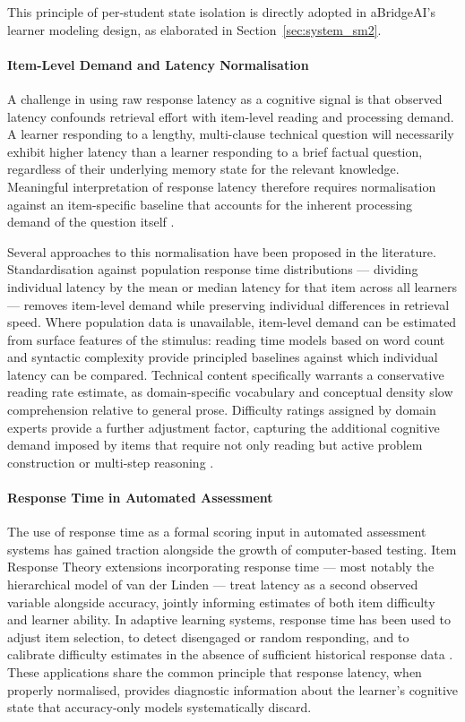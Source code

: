 This principle of per-student state isolation is directly adopted in aBridgeAI's learner modeling design, as elaborated in Section~\ref{sec:system_sm2}.

\paragraph{Item-Level Demand and Latency Normalisation}
A challenge in using raw response latency as a cognitive signal is that observed latency confounds retrieval effort with item-level reading and processing demand. A learner responding to a lengthy, multi-clause technical question will necessarily exhibit higher latency than a learner responding to a brief factual question, regardless of their underlying memory state for the relevant knowledge. Meaningful interpretation of response latency therefore requires normalisation against an item-specific baseline that accounts for the inherent processing demand of the question itself \cite{cowan2001}.

Several approaches to this normalisation have been proposed in the literature. Standardisation against population response time distributions — dividing individual latency by the mean or median latency for that item across all learners — removes item-level demand while preserving individual differences in retrieval speed. Where population data is unavailable, item-level demand can be estimated from surface features of the stimulus: reading time models based on word count and syntactic complexity provide principled baselines against which individual latency can be compared. Technical content specifically warrants a conservative reading rate estimate, as domain-specific vocabulary and conceptual density slow comprehension relative to general prose. Difficulty ratings assigned by domain experts provide a further adjustment factor, capturing the additional cognitive demand imposed by items that require not only reading but active problem construction or multi-step reasoning \cite{Cog2019Sweller}.

\paragraph{Response Time in Automated Assessment}
The use of response time as a formal scoring input in automated assessment systems has gained traction alongside the growth of computer-based testing. Item Response Theory extensions incorporating response time — most notably the hierarchical model of van der Linden \cite{vanderlinden2007} — treat latency as a second observed variable alongside accuracy, jointly informing estimates of both item difficulty and learner ability. In adaptive learning systems, response time has been used to adjust item selection, to detect disengaged or random responding, and to calibrate difficulty estimates in the absence of sufficient historical response data \cite{lee2014}. These applications share the common principle that response latency, when properly normalised, provides diagnostic information about the learner's cognitive state that accuracy-only models systematically discard.

